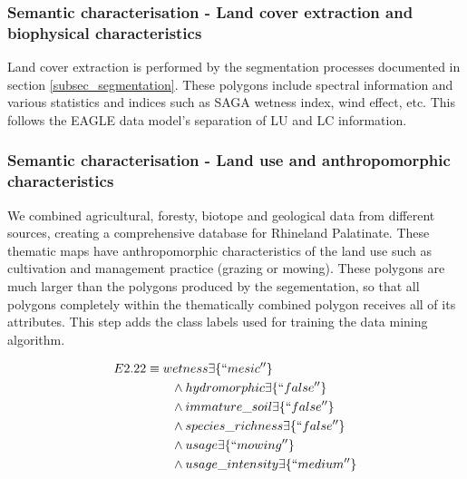 \documentclass[authoryear, review,12pt,number]{elsarticle}
\begin{document}
\subsubsection{Semantic characterisation - Land cover extraction and biophysical
characteristics} Land cover extraction is performed by the segmentation
processes documented in section \ref{subsec_segmentation}. 
These polygons include spectral information and
various statistics and indices such as SAGA wetness index, wind effect, etc.
This follows the EAGLE data model's separation of LU and LC information.

\subsubsection{Semantic characterisation - Land use and anthropomorphic
characteristics} We combined agricultural, foresty, biotope and geological data from different 
sources, creating a comprehensive database for Rhineland Palatinate. These 
thematic maps have anthropomorphic characteristics of the land use such as 
cultivation and management practice (grazing or mowing). These polygons are 
much larger than the polygons produced by the segementation, so that all 
polygons completely within the thematically combined polygon receives all of 
its attributes. This step adds the class labels used for training the data 
mining algorithm. 

\begin{equation}
\begin{align*}
E2.22 &\equiv wetness \exists \{``mesic''\} \\
&\qquad {} \land hydromorphic \exists \{``false''\} \\
&\qquad {} \land immature\_soil \exists \{``false''\} \\
&\qquad {} \land species\_richness \exists \{``false''\} \\
&\qquad {} \land usage \exists \{``mowing''\} \\
&\qquad {} \land usage\_intensity \exists \{``medium''\} \\
\end{align*}
\label{eq:description_logic}
\end{equation}
\end{document}

